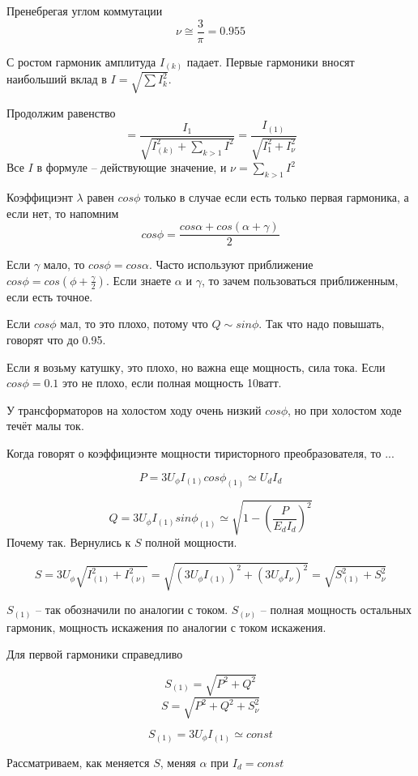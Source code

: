 Пренебрегая углом коммутации
$$
\nu \cong \frac{3}{\pi} = 0.955
$$

С ростом гармоник амплитуда $I_{(k)}$ падает. Первые гармоники вносят наибольший вклад в
$I =\sqrt{\sum I^2_{{k}}}$.

Продолжим равенство
$$
=  \frac{I_{1}}{\sqrt{I_{(k)}^2 + \sum\limits_{k>1} I^2}} = \frac{I_{(1)}}
{\sqrt{I_1^2+I_\nu^2}}
$$
Все $I$ в формуле -- действующие значение, и $\nu= \sum\limits_{k>1} I^2$

Коэффициэнт $\lambda$ равен $cos\phi$ только в случае если есть только первая гармоника,
а если нет, то
напомним
$$
cos \phi = \frac{cos\alpha + cos(\alpha+\gamma)}{2} 
$$

Если $\gamma$ мало, то $cos\phi = cos\alpha$. Часто используют приближение
$cos\phi = cos(\phi + \frac{\gamma}{2})$. Если знаете $\alpha$ и $\gamma$, то зачем
пользоваться приближенным, если есть точное.

Если $cos\phi$ мал, то это плохо, потому что $Q \sim sin\phi$. Так что надо повышать,
говорят что до 0.95.

Если я возьму катушку, это плохо, но важна еще мощность, сила тока. Если $cos\phi=0.1$ это
не плохо, если полная мощность 10ватт.

У трансформаторов на холостом ходу очень низкий $cos\phi$, но при холостом ходе
течёт малы ток.

Когда говорят о коэффициэнте мощности тиристорного преобразователя, то ...

$$
P = 3U_\phi I_{(1)} cos\phi_{(1)} \simeq U_d I_d
$$

$$
Q=3U_\phi I_{(1)} sin\phi_{(1)} \simeq \sqrt{1-\left(
\frac{P}{E_dI_d}
  \right)^2} 
$$
Почему так. Вернулись к $S$ полной мощности.

$$
S = 3U_\phi \sqrt{I_{(1)}^2 + I_{(\nu)}^2} =
\sqrt{\left(3U_\phi I_{(1)}\right)^2 + \left(3U_\phi I_\nu\right)^2} =
  \sqrt{S_{(1)}^2+S_\nu^2}
$$

  $S_{(1)}$ -- так обозначили по аналогии с током. $S_{(\nu)}$ -- полная мощность остальных
  гармоник, мощность искажения по аналогии с током искажения.

  Для первой гармоники справедливо

  $$
  S_{(1)} =\sqrt{P^2+Q^2}
  $$
  \begin{equation}
    S=\sqrt{P^2+Q^2+S_\nu^2}
  \end{equation}

$$  
  S_{(1)} = 3U_\phi I_{(1)} \simeq const
  $$

  Рассматриваем, как меняется $S$, меняя $\alpha$ при $I_d=const$

